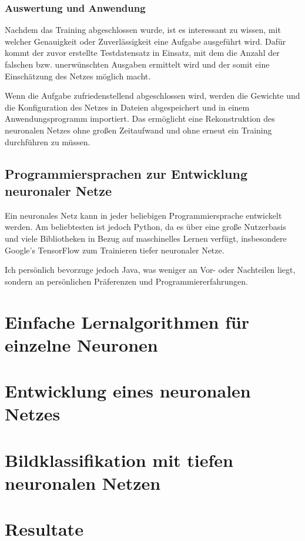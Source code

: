\documentclass[12pt,a4]{article}
\begin{document}
\subsubsection{Auswertung und Anwendung}
Nachdem das Training abgeschlossen wurde, ist es interessant zu wissen, mit welcher Genauigkeit oder Zuverlässigkeit eine Aufgabe ausgeführt wird. Dafür kommt der zuvor erstellte Testdatensatz in Einsatz, mit dem die Anzahl der falschen bzw. unerwünschten Ausgaben ermittelt wird und der somit eine Einschätzung des Netzes möglich macht.

Wenn die Aufgabe zufriedenstellend abgeschlossen wird, werden die Gewichte und die Konfiguration des Netzes in Dateien abgespeichert und in einem Anwendungsprogramm importiert. Das ermöglicht eine Rekonstruktion des neuronalen Netzes ohne großen Zeitaufwand und ohne erneut ein Training durchführen zu müssen.

\subsection{Programmiersprachen zur Entwicklung neuronaler Netze \cite{PythonMachineLearningChapter1}}
Ein neuronales Netz kann in jeder beliebigen Programmiersprache entwickelt werden. Am beliebtesten ist jedoch Python, da es über eine große Nutzerbasis und viele Bibliotheken in Bezug auf maschinelles Lernen verfügt, insbesondere Google's TensorFlow zum Trainieren tiefer neuronaler Netze.

Ich persönlich bevorzuge jedoch Java, was weniger an Vor- oder Nachteilen liegt, sondern an persönlichen Präferenzen und Programmiererfahrungen.

\section{Einfache Lernalgorithmen für einzelne Neuronen \cite{PythonMachineLearningChapter2}}

\section{Entwicklung eines neuronalen Netzes \cite{PythonMachineLearningChapter12}}

\section{Bildklassifikation mit tiefen neuronalen Netzen \cite{PythonMachineLearningChapter15}}

\section{Resultate}



\end{document}
